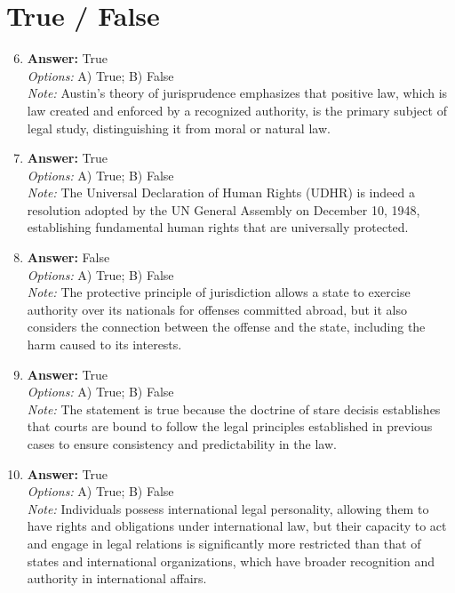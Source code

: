 \documentclass[12pt]{article}
\begin{document}
\section*{True / False}
\begin{enumerate}[label=\arabic*.]
\setcounter{enumi}{5}
\item \textbf{Answer:} True
\\ \textit{Options:} A) True; B) False
\\ \textit{Note:} Austin's theory of jurisprudence emphasizes that positive law, which is law created and enforced by a recognized authority, is the primary subject of legal study, distinguishing it from moral or natural law.
\item \textbf{Answer:} True
\\ \textit{Options:} A) True; B) False
\\ \textit{Note:} The Universal Declaration of Human Rights (UDHR) is indeed a resolution adopted by the UN General Assembly on December 10, 1948, establishing fundamental human rights that are universally protected.
\item \textbf{Answer:} False
\\ \textit{Options:} A) True; B) False
\\ \textit{Note:} The protective principle of jurisdiction allows a state to exercise authority over its nationals for offenses committed abroad, but it also considers the connection between the offense and the state, including the harm caused to its interests.
\item \textbf{Answer:} True
\\ \textit{Options:} A) True; B) False
\\ \textit{Note:} The statement is true because the doctrine of stare decisis establishes that courts are bound to follow the legal principles established in previous cases to ensure consistency and predictability in the law.
\item \textbf{Answer:} True
\\ \textit{Options:} A) True; B) False
\\ \textit{Note:} Individuals possess international legal personality, allowing them to have rights and obligations under international law, but their capacity to act and engage in legal relations is significantly more restricted than that of states and international organizations, which have broader recognition and authority in international affairs.
\end{enumerate}
\end{document}
